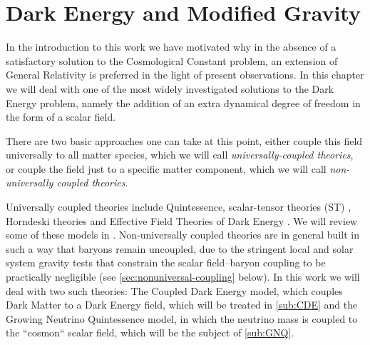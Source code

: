 %



\section{Dark Energy and Modified Gravity \label{sec:DE-MG-sec}}


In the introduction to this work we have motivated why in the absence of a satisfactory
solution to the Cosmological Constant problem, an extension of General Relativity
is preferred in the light of present observations.
In this chapter we will deal with one of the most widely investigated solutions to the Dark Energy problem,
namely the addition of an extra dynamical degree of freedom in the form of a scalar field.

There are two basic approaches one can take at this point, either couple this field universally to all matter species, which we will call \emph{ universally-coupled theories},
or couple the field just to a specific matter component, which we will call
\emph{non-universally coupled theories}.

Universally coupled theories include Quintessence, scalar-tensor theories (ST) \cite{Luca, Skordis, de Felice, etc.}, Horndeski theories \cite{cite Horndeski, Defayyet} and Effective Field Theories of Dark Energy \cite{cite, EFT, people}.
We will review some of these models in .
Non-universally coupled theories are in general built in such a way that baryons remain uncoupled, due to the stringent local and solar system gravity tests that constrain the scalar field--baryon coupling to be practically negligible (see \cref{sec:nonuniversal-coupling} below). In this work we will 
deal with two such theories: The Coupled Dark Energy model, which couples Dark Matter to a Dark Energy field, which will be treated in \cref{sub:CDE} and the Growing Neutrino Quintessence model, in which the neutrino mass is coupled to the ``cosmon`` scalar field, which will be the subject of \cref{sub:GNQ}.

